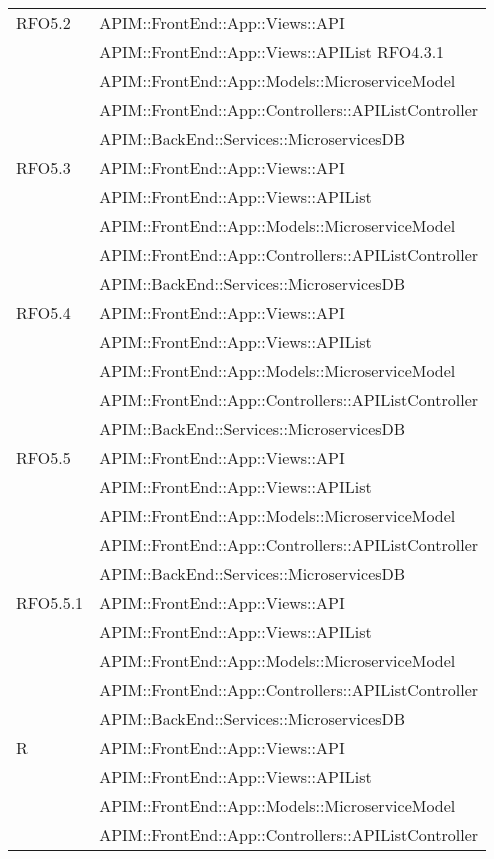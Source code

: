 \begin{longtable}{ p{4cm} | p{12cm} }
	\hline		
	RFO5.2
	& APIM::FrontEnd::App::Views::API \\
	& APIM::FrontEnd::App::Views::APIList RFO4.3.1 \\
	& APIM::FrontEnd::App::Models::MicroserviceModel \\
	& APIM::FrontEnd::App::Controllers::APIListController \\
	& APIM::BackEnd::Services::MicroservicesDB \\
	\hline		
	RFO5.3
	& APIM::FrontEnd::App::Views::API \\
	& APIM::FrontEnd::App::Views::APIList \\
	& APIM::FrontEnd::App::Models::MicroserviceModel \\
	& APIM::FrontEnd::App::Controllers::APIListController \\
	& APIM::BackEnd::Services::MicroservicesDB \\
	\hline		
	RFO5.4
	& APIM::FrontEnd::App::Views::API \\
	& APIM::FrontEnd::App::Views::APIList \\
	& APIM::FrontEnd::App::Models::MicroserviceModel \\
	& APIM::FrontEnd::App::Controllers::APIListController \\
	& APIM::BackEnd::Services::MicroservicesDB \\
	\hline		
	RFO5.5
	& APIM::FrontEnd::App::Views::API \\
	& APIM::FrontEnd::App::Views::APIList \\
	& APIM::FrontEnd::App::Models::MicroserviceModel \\
	& APIM::FrontEnd::App::Controllers::APIListController \\
	& APIM::BackEnd::Services::MicroservicesDB \\
	\hline		
	RFO5.5.1
	& APIM::FrontEnd::App::Views::API \\
	& APIM::FrontEnd::App::Views::APIList \\
	& APIM::FrontEnd::App::Models::MicroserviceModel \\
	& APIM::FrontEnd::App::Controllers::APIListController \\
	& APIM::BackEnd::Services::MicroservicesDB \\
	\hline		
	R
	& APIM::FrontEnd::App::Views::API \\
	& APIM::FrontEnd::App::Views::APIList \\
	& APIM::FrontEnd::App::Models::MicroserviceModel \\
	& APIM::FrontEnd::App::Controllers::APIListController \\

\end{longtable}
